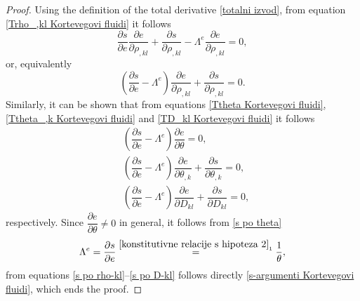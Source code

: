\documentclass[a4paper,fleqn]{cas-sc}
\theoremstyle{definition}
\begin{document}
\begin{proof}
	Using the definition of the total derivative \eqref{totalni izvod}, from equation \eqref{Trho_,kl Kortevegovi fluidi} it follows
	\begin{equation*}
		\dfrac{\partial s}{\partial e}\dfrac{\partial e}{\partial\rho_{,kl}}+\dfrac{\partial s}{\partial\rho_{,kl}}-\Lambda^e\dfrac{\partial e}{\partial\rho_{,kl}}=0,
	\end{equation*}
	or, equivalently
	\begin{equation} \label{s po rho-kl}
		\left(\dfrac{\partial s}{\partial e}-\Lambda^e\right)\dfrac{\partial e}{\partial\rho_{,kl}}+\dfrac{\partial s}{\partial\rho_{,kl}}=0.
	\end{equation} 
	Similarly, it can be shown that from equations \eqref{Ttheta Kortevegovi fluidi}, \eqref{Ttheta_,k Kortevegovi fluidi} and \eqref{TD_kl Kortevegovi fluidi} it follows
	\begin{align} 
		\label{s po theta}
		& \left(\dfrac{\partial s}{\partial e}-\Lambda^e\right)\dfrac{\partial e}{\partial\theta}=0, 
		\\
		\label{s po theta-k}
		& \left(\dfrac{\partial s}{\partial e}-\Lambda^e\right)\dfrac{\partial e}{\partial\theta_{,k}}+\dfrac{\partial s}{\partial\theta_{,k}}=0, 
		\\
		\label{s po D-kl} 
		& \left(\dfrac{\partial s}{\partial e}-\Lambda^e\right)\dfrac{\partial e}{\partial D_{kl}}+\dfrac{\partial s}{\partial D_{kl}}=0,
	\end{align}
	respectively. Since $\dfrac{\partial e}{\partial \theta} \neq 0$ in general, it follows from \eqref{s po theta} 
	\begin{equation} \label{Lambda_e Kortevegovi fluidi}
		\Lambda^e = \dfrac{\partial s}{\partial e} \overset{\eqref{konstitutivne relacije s hipoteza 2}_{1}}{=} \dfrac{1}{\theta}, 
	\end{equation} 
	from equations \eqref{s po rho-kl}--\eqref{s po D-kl} follows directly \eqref{s-argumenti Kortevegovi fluidi}, which ends the proof.
\end{proof} 
\end{document}
